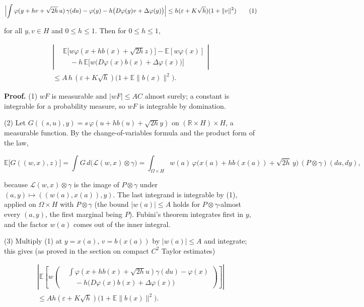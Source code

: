 \documentclass[11pt,a4paper]{report}
\begin{document}
\[\Bigl|\int\varphi(y+hv+\sqrt{2h}\,u)\,\gamma(du)-\varphi(y)-h\bigl(D\varphi(y)v+\Delta\varphi(y)\bigr)\Bigr|\le h(\varepsilon+K\sqrt h)(1+\|v\|^2)\qquad(1)\]


for all \(y,v\in H\) and \(0\le h\le1\). Then for \(0\le h\le1\),


\[\begin{gathered}
\left|\begin{aligned}
&\mathbb E\bigl[w\varphi(x+hb(x)+\sqrt{2h}z)\bigr]-\mathbb E[w\varphi(x)]\\
&\quad-h\,\mathbb E\bigl[w\bigl(D\varphi(x)b(x)+\Delta\varphi(x)\bigr)\bigr]
\end{aligned}\right|\\
\le A\,h\,(\varepsilon+K\sqrt h)\bigl(1+\mathbb E\|b(x)\|^2\bigr).
\end{gathered}\]


\textbf{Proof.} (1) \(wF\) is measurable and \(|wF|\le AC\) almost surely; a constant is integrable for a probability measure, so \(wF\) is integrable by domination.




(2) Let \(G((s,u),y)=s\,\varphi(u+hb(u)+\sqrt{2h}y)\) on \((\mathbb R\times H)\times H\), a measurable function. By the change-of-variables formula and the product form of the law,


\[\mathbb E\bigl[G((w,x),z)\bigr]=\int G\,d\bigl(\mathcal L(w,x)\otimes\gamma\bigr)=\int_{\Omega\times H}w(a)\,\varphi\bigl(x(a)+hb(x(a))+\sqrt{2h}\,y\bigr)\,(P\otimes\gamma)(da,dy),\]


because \(\mathcal L(w,x)\otimes\gamma\) is the image of \(P\otimes\gamma\) under \((a,y)\mapsto((w(a),x(a)),y)\). The last integrand is integrable by (1), applied on \(\Omega\times H\) with \(P\otimes\gamma\) (the bound \(|w(a)|\le A\) holds for \(P\otimes\gamma\)-almost every \((a,y)\), the first marginal being \(P\)). Fubini's theorem integrates first in \(y\), and the factor \(w(a)\) comes out of the inner integral.




(3) Multiply (1) at \(y=x(a)\), \(v=b(x(a))\) by \(|w(a)|\le A\) and integrate; this gives (as proved in the section on compact \(C^2\) Taylor estimates)


\[\begin{gathered}
\left|\mathbb E\left[w\left(\begin{aligned}
&\int\varphi(x+hb(x)+\sqrt{2h}u)\gamma(du)-\varphi(x)\\
&\quad-h\bigl(D\varphi(x)b(x)+\Delta\varphi(x)\bigr)
\end{aligned}\right)\right]\right|\\
\le Ah(\varepsilon+K\sqrt h)\bigl(1+\mathbb E\|b(x)\|^2\bigr).
\end{gathered}\]
\end{document}
